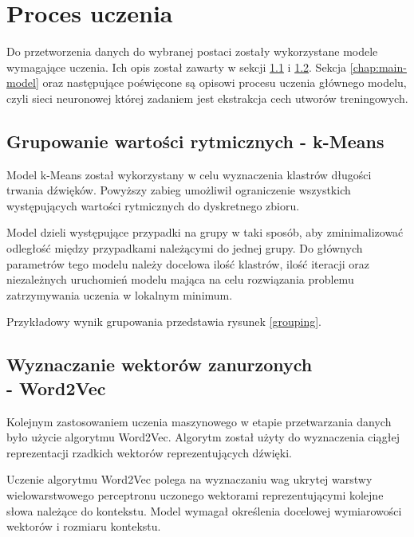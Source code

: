 \chapter{Proces uczenia}\label{chap:training}
{
    Do przetworzenia danych do wybranej postaci zostały wykorzystane modele wymagające uczenia.
    Ich opis został zawarty w sekcji \ref{chap:models_data_k} i \ref{chap:models_data_v}. Sekcja \ref{chap:main-model} oraz następujące
    poświęcone są opisowi procesu uczenia głównego modelu, czyli sieci neuronowej której 
    zadaniem jest ekstrakcja cech utworów treningowych.

    \section{Grupowanie wartości rytmicznych - k-Means}\label{chap:models_data_k}
    {
        Model k-Means został wykorzystany w celu wyznaczenia klastrów
        długości trwania dźwięków. Powyższy zabieg umożliwił ograniczenie wszystkich występujących 
        wartości rytmicznych do dyskretnego zbioru. 
        
        Model dzieli występujące przypadki na grupy w taki sposób, aby zminimalizować odległość 
        między przypadkami należącymi do jednej grupy.
        Do głównych parametrów tego modelu należy docelowa ilość klastrów, ilość iteracji
        oraz niezależnych uruchomień modelu mająca na celu rozwiązania problemu zatrzymywania uczenia w lokalnym minimum.

        Przykładowy wynik grupowania przedstawia rysunek \ref{grouping}.

        
    }

    \section{Wyznaczanie wektorów zanurzonych \\ - Word2Vec}\label{chap:models_data_v}
    {
        Kolejnym zastosowaniem uczenia maszynowego w etapie przetwarzania danych było użycie algorytmu Word2Vec. Algorytm 
        został użyty do wyznaczenia ciągłej reprezentacji rzadkich wektorów reprezentujących dźwięki.
        
        Uczenie algorytmu Word2Vec polega na wyznaczaniu wag ukrytej warstwy wielowarstwowego perceptronu
        uczonego wektorami reprezentującymi kolejne słowa należące do kontekstu.
        Model wymagał określenia docelowej wymiarowości wektorów i rozmiaru kontekstu. 

}}
